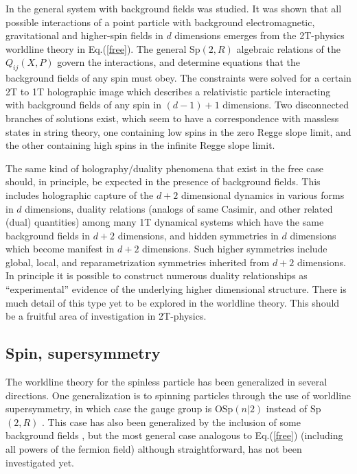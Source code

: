 \documentclass[a4paper,12pt]{article}
\begin{document}
In \cite{highspin} the general system with background fields was
studied. It was shown that all possible interactions of a point
particle with background electromagnetic, gravitational and
higher-spin fields in $d$ dimensions emerges from the 2T-physics
worldline theory in Eq.(\ref{free}). The general Sp$(2,R)$
algebraic relations of the $Q_{ij}\left( X,P\right) $ govern the
interactions, and determine equations that the background fields
of any spin must obey. The constraints were solved for a certain
2T to 1T holographic image which describes a relativistic particle
interacting with background fields of any spin in $(d-1)+1$
dimensions. Two disconnected branches of solutions exist, which
seem to have a correspondence with massless states in string
theory, one containing low spins in the zero Regge slope limit,
and the other containing high spins in the infinite Regge slope
limit.

The same kind of holography/duality phenomena that exist in the free case
should, in principle, be expected in the presence of background fields. This
includes holographic capture of the $d+2$ dimensional dynamics in various
forms in $d$ dimensions, duality relations (analogs of same Casimir, and
other related (dual) quantities) among many 1T dynamical systems which have
the same background fields in $d+2$ dimensions, and hidden symmetries in $d$
dimensions which become manifest in $d+2$ dimensions. Such higher symmetries
include global, local, and reparametrization symmetries inherited from $d+2$
dimensions. In principle it is possible to construct numerous duality
relationships as ``experimental'' evidence of the underlying higher
dimensional structure. There is much detail of this type yet to be explored
in the worldline theory. This should be a fruitful area of investigation in
2T-physics.

\subsection{Spin, supersymmetry}

The worldline theory for the spinless particle has been
generalized in several directions. One generalization is to
spinning particles through the use of worldline supersymmetry, in
which case the gauge group is OSp$\left( n|2\right) $ instead of
Sp$\left( 2,R\right) $ \cite{spin2t}$.$ This case has also been
generalized by the inclusion of some background fields \cite
{field2T}, but the most general case analogous to Eq.(\ref{free})
(including all powers of the fermion field) although
straightforward, has not been investigated yet.
\end{document}
